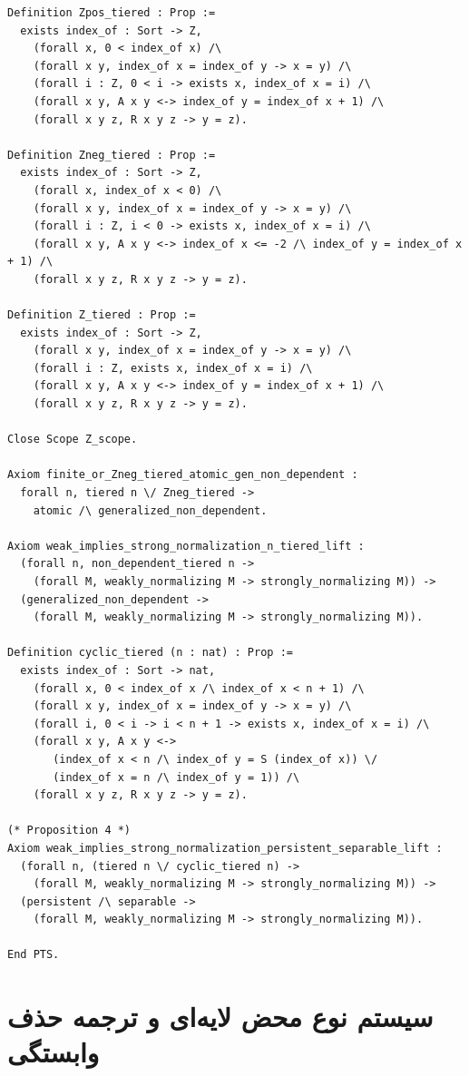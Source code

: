 \begin{latin}
\begin{verbatim}
Definition Zpos_tiered : Prop :=
  exists index_of : Sort -> Z,
    (forall x, 0 < index_of x) /\
    (forall x y, index_of x = index_of y -> x = y) /\
    (forall i : Z, 0 < i -> exists x, index_of x = i) /\
    (forall x y, A x y <-> index_of y = index_of x + 1) /\
    (forall x y z, R x y z -> y = z).

Definition Zneg_tiered : Prop :=
  exists index_of : Sort -> Z,
    (forall x, index_of x < 0) /\
    (forall x y, index_of x = index_of y -> x = y) /\
    (forall i : Z, i < 0 -> exists x, index_of x = i) /\
    (forall x y, A x y <-> index_of x <= -2 /\ index_of y = index_of x + 1) /\
    (forall x y z, R x y z -> y = z).

Definition Z_tiered : Prop :=
  exists index_of : Sort -> Z,
    (forall x y, index_of x = index_of y -> x = y) /\
    (forall i : Z, exists x, index_of x = i) /\
    (forall x y, A x y <-> index_of y = index_of x + 1) /\
    (forall x y z, R x y z -> y = z).

Close Scope Z_scope.

Axiom finite_or_Zneg_tiered_atomic_gen_non_dependent :
  forall n, tiered n \/ Zneg_tiered ->
    atomic /\ generalized_non_dependent.

Axiom weak_implies_strong_normalization_n_tiered_lift :
  (forall n, non_dependent_tiered n ->
    (forall M, weakly_normalizing M -> strongly_normalizing M)) ->
  (generalized_non_dependent ->
    (forall M, weakly_normalizing M -> strongly_normalizing M)).

Definition cyclic_tiered (n : nat) : Prop :=
  exists index_of : Sort -> nat,
    (forall x, 0 < index_of x /\ index_of x < n + 1) /\
    (forall x y, index_of x = index_of y -> x = y) /\
    (forall i, 0 < i -> i < n + 1 -> exists x, index_of x = i) /\
    (forall x y, A x y <->
       (index_of x < n /\ index_of y = S (index_of x)) \/
       (index_of x = n /\ index_of y = 1)) /\
    (forall x y z, R x y z -> y = z).

(* Proposition 4 *)
Axiom weak_implies_strong_normalization_persistent_separable_lift :
  (forall n, (tiered n \/ cyclic_tiered n) ->
    (forall M, weakly_normalizing M -> strongly_normalizing M)) ->
  (persistent /\ separable ->
    (forall M, weakly_normalizing M -> strongly_normalizing M)).

End PTS.
\end{verbatim}
\end{latin}

\section*{سیستم‌ نوع محض لایه‌ای و ترجمه‌ حذف وابستگی}

